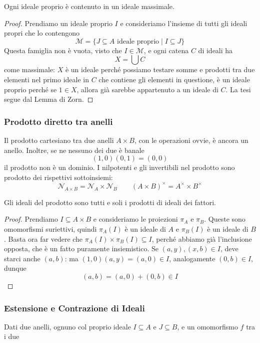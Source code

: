 \begin{multicols}{2}
\begin{prop}\label{idmax}
	Ogni ideale proprio è contenuto in un ideale massimale.
\end{prop}
\begin{proof}
	Prendiamo un ideale proprio $ I $ e consideriamo l'insieme di tutti gli ideali propri che lo contengono
	\[ \mathcal{M} = \{ J \subseteq A \text{ ideale proprio} \mid I \subseteq J \} \]
	Questa famiglia non è vuota, visto che $ I \in \mathcal{M} $, e ogni catena $ C $ di ideali ha 
	\[ X = \bigcup C \]
	come massimale: $ X $ è un ideale perché possiamo testare somme e prodotti tra due elementi nel primo ideale in $ C $ che contiene gli elementi in questione, è un ideale proprio perché se $ 1 \in  X $, allora già sarebbe appartenuto a un ideale di $ C $. La tesi segue dal Lemma di Zorn.
\end{proof}
	

\subsubsection{Prodotto diretto tra anelli} Il prodotto cartesiano tra due anelli $ A \times B $, con le operazioni ovvie, è ancora un anello. Inoltre, se ne nessuno dei due è banale \[ (1, 0)(0, 1) = (0, 0) \] il prodotto non è un dominio. I nilpotenti e gli invertibili nel prodotto sono prodotto dei rispettivi sottoinsiemi:
\[ \mathcal{N}_{A \times B} = \mathcal{N}_A \times \mathcal{N}_B \qquad (A\times B)^\times = A^\times \times B^\times \]

\begin{prop}
Gli ideali del prodotto sono tutti e soli i prodotti di ideali dei fattori.
\end{prop}
\begin{proof}
	Prendiamo $ I \subseteq A \times B $ e consideriamo le proiezioni $ \pi_A $ e $ \pi_B $. Queste sono omomorfismi suriettivi, quindi $ \pi_A(I) $ è un ideale di $ A $ e $ \pi_B(I) $ è un ideale di $ B $. Basta ora far vedere che $ \pi_A(I) \times \pi_B(I) \subseteq I $, perché abbiamo già l'inclusione opposta, che è un fatto puramente insiemistico. Se $ (a, y), (x, b) \in I $, deve starci anche $ (a, b) $: ma $ (1, 0)(a, y) = (a, 0) \in I $, analogamente $ (0, b) \in I $, dunque
	\[ (a, b) = (a, 0) + (0, b) \in I \]
\end{proof}
 

\subsubsection{Estensione e Contrazione di Ideali} Dati due anelli, ognuno col proprio ideale $ I \subseteq A $ e $ J  \subseteq B $, e un omomorfismo $ f $ tra i due


\end{multicols}
